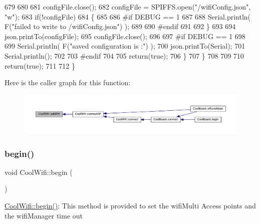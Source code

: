 \begin{DoxyCode}
679             
680 
681             configFile.close();
682             configFile = SPIFFS.open(\textcolor{stringliteral}{"/wifiConfig.json"}, \textcolor{stringliteral}{"w"});
683             \textcolor{keywordflow}{if}(!configFile)
684             \{
685             
686 \textcolor{preprocessor}{            #if DEBUG == 1 }
687 
688                 Serial.println( F(\textcolor{stringliteral}{"failed to write to /wifiConfig.json"}) );
689             
690 \textcolor{preprocessor}{            #endif}
691 
692             \}
693             
694             json.printTo(configFile);
695             configFile.close();
696 
697 \textcolor{preprocessor}{        #if DEBUG == 1 }
698 
699             Serial.println( F(\textcolor{stringliteral}{"saved configuration is :"}) );
700             json.printTo(Serial);
701             Serial.println();
702         
703 \textcolor{preprocessor}{        #endif}
704 
705             \textcolor{keywordflow}{return}(\textcolor{keyword}{true}); 
706         \}
707     \}   
708 
709     
710     \textcolor{keywordflow}{return}(\textcolor{keyword}{true});
711     
712 \}
\end{DoxyCode}
Here is the caller graph for this function\+:\nopagebreak
\begin{figure}[H]
\begin{center}
\leavevmode
\includegraphics[width=350pt]{classCoolWifi_a914d7a1df14dd6b75345fb614c34e9d6_icgraph}
\end{center}
\end{figure}
\mbox{\label{classCoolWifi_a46942fed90e475112cc10b78a32e7aaa}} 
\subsubsection{\texorpdfstring{begin()}{begin()}}
{\footnotesize\ttfamily void Cool\+Wifi\+::begin (\begin{DoxyParamCaption}{ }\end{DoxyParamCaption})}

\hyperlink{classCoolWifi_a46942fed90e475112cc10b78a32e7aaa}{Cool\+Wifi\+::begin()}\+: This method is provided to set the wifi\+Multi Access points and the wifi\+Manager time out 

